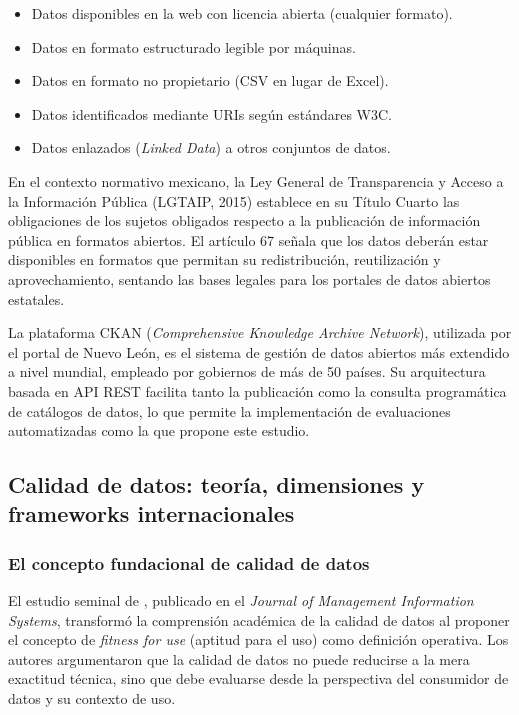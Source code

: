 \documentclass[12pt,letterpaper]{article}
\begin{document}
\begin{itemize}
  \item[$\star$] Datos disponibles en la web con licencia abierta (cualquier formato).
  \item[$\star\star$] Datos en formato estructurado legible por máquinas.
  \item[$\star\star\star$] Datos en formato no propietario (CSV en lugar de Excel).
  \item[$\star\star\star\star$] Datos identificados mediante URIs según estándares W3C.
  \item[$\star\star\star\star\star$] Datos enlazados (\textit{Linked Data}) a otros conjuntos de datos.
\end{itemize}

En el contexto normativo mexicano, la Ley General de Transparencia y Acceso a la Información Pública (LGTAIP, 2015) establece en su Título Cuarto las obligaciones de los sujetos obligados respecto a la publicación de información pública en formatos abiertos. El artículo 67 señala que los datos deberán estar disponibles en formatos que permitan su redistribución, reutilización y aprovechamiento, sentando las bases legales para los portales de datos abiertos estatales.

La plataforma CKAN (\textit{Comprehensive Knowledge Archive Network}), utilizada por el portal de Nuevo León, es el sistema de gestión de datos abiertos más extendido a nivel mundial, empleado por gobiernos de más de 50 países. Su arquitectura basada en API REST facilita tanto la publicación como la consulta programática de catálogos de datos, lo que permite la implementación de evaluaciones automatizadas como la que propone este estudio.

\subsection{Calidad de datos: teoría, dimensiones y frameworks internacionales}

\subsubsection{El concepto fundacional de calidad de datos}

El estudio seminal de \textcite{wang1996}, publicado en el \textit{Journal of Management Information Systems}, transformó la comprensión académica de la calidad de datos al proponer el concepto de \textit{fitness for use} (aptitud para el uso) como definición operativa. Los autores argumentaron que la calidad de datos no puede reducirse a la mera exactitud técnica, sino que debe evaluarse desde la perspectiva del consumidor de datos y su contexto de uso.
\end{document}
